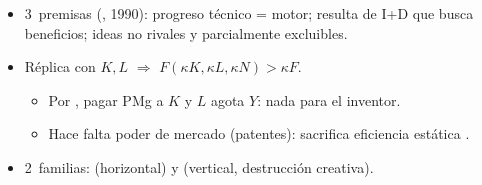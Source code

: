 \documentclass{article}
\begin{document}
\begin{columnas}
\begin{itemize}
\item 3~premisas (, 1990): progreso técnico = motor; resulta de I+D que busca beneficios; ideas no rivales y parcialmente excluibles.
\item Réplica con $K,L$ $\Rightarrow$ $F(\kappa K,\kappa L,\kappa N)>\kappa F$.
  \begin{itemize}
  \item Por , pagar PMg a $K$ y $L$ agota $Y$: nada para el inventor.
  \item Hace falta poder de mercado (patentes): sacrifica eficiencia estática .
  \end{itemize}
\item 2~familias:  (horizontal) y  (vertical, destrucción creativa).
\end{itemize}


\end{columnas}
\end{document}
